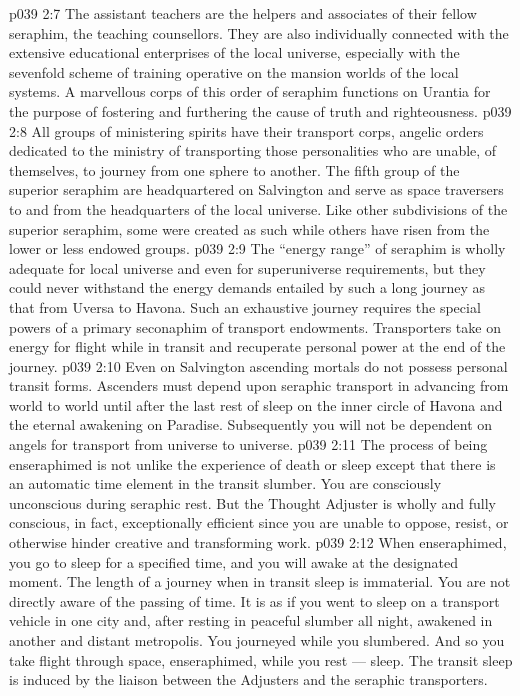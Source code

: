 \vs p039 2:7 \bibnobreakspace {} The assistant teachers are the helpers and associates of their fellow seraphim, the teaching counsellors. They are also individually connected with the extensive educational enterprises of the local universe, especially with the sevenfold scheme of training operative on the mansion worlds of the local systems. A marvellous corps of this order of seraphim functions on Urantia for the purpose of fostering and furthering the cause of truth and righteousness.
\vs p039 2:8 \bibnobreakspace {} All groups of ministering spirits have their transport corps, angelic orders dedicated to the ministry of transporting those personalities who are unable, of themselves, to journey from one sphere to another. The fifth group of the superior seraphim are headquartered on Salvington and serve as space traversers to and from the headquarters of the local universe. Like other subdivisions of the superior seraphim, some were created as such while others have risen from the lower or less endowed groups.
\vs p039 2:9 \pc The “energy range” of seraphim is wholly adequate for local universe and even for superuniverse requirements, but they could never withstand the energy demands entailed by such a long journey as that from Uversa to Havona. Such an exhaustive journey requires the special powers of a primary seconaphim of transport endowments. Transporters take on energy for flight while in transit and recuperate personal power at the end of the journey.
\vs p039 2:10 \pc Even on Salvington ascending mortals do not possess personal transit forms. Ascenders must depend upon seraphic transport in advancing from world to world until after the last rest of sleep on the inner circle of Havona and the eternal awakening on Paradise. Subsequently you will not be dependent on angels for transport from universe to universe.
\vs p039 2:11 The process of being enseraphimed is not unlike the experience of death or sleep except that there is an automatic time element in the transit slumber. You are consciously unconscious during seraphic rest. But the Thought Adjuster is wholly and fully conscious, in fact, exceptionally efficient since you are unable to oppose, resist, or otherwise hinder creative and transforming work.
\vs p039 2:12 When enseraphimed, you go to sleep for a specified time, and you will awake at the designated moment. The length of a journey when in transit sleep is immaterial. You are not directly aware of the passing of time. It is as if you went to sleep on a transport vehicle in one city and, after resting in peaceful slumber all night, awakened in another and distant metropolis. You journeyed while you slumbered. And so you take flight through space, enseraphimed, while you rest --- sleep. The transit sleep is induced by the liaison between the Adjusters and the seraphic transporters.
